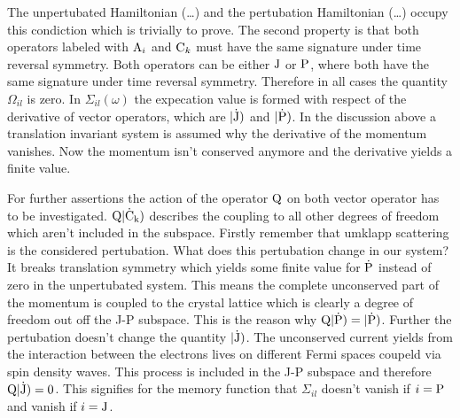 The unpertubated Hamiltonian (\dots{}) and the pertubation Hamiltonian (\dots{}) occupy this condiction which is trivially to prove.
The second property is that both operators labeled with $\mathrm{A}_{i}$ and $\mathrm{C}_{k}$ must have the same signature under time reversal symmetry.
Both operators can be either $\mathrm{J}$ or $\mathrm{P}$, where both have the same signature under time reversal symmetry.
Therefore in all cases the quantity $\Omega_{il}$ is zero.
In $\Sigma_{il}(\omega)$ the expecation value is formed with respect of the derivative of vector operators, which are $|\mathrm{\dot{\mathrm{J}}})$ and $|\mathrm{\dot{\mathrm{P}}})$.
In the discussion above a translation invariant system is assumed why the derivative of the momentum vanishes.
Now the momentum isn't conserved anymore and the derivative yields a finite value.

For further assertions the action of the operator $\mathrm{Q}$ on both vector operator has to be investigated.
$\mathrm{Q} |\mathrm{\dot{\mathrm{C}}_{k}})$ describes the coupling to all other degrees of freedom which aren't included in the subspace.
Firstly remember that umklapp scattering is the considered pertubation.
What does this pertubation change in our system?
It breaks translation symmetry which yields some finite value for $\dot{\mathrm{P}}$ instead of zero in the unpertubated system.
This means the complete unconserved part of the momentum is coupled to the crystal lattice which is clearly a degree of freedom out off the J-P subspace.
This is the reason why $\mathrm{Q} |\mathrm{\dot{\mathrm{P}}}) = |\mathrm{\dot{\mathrm{P}}})$.
Further the pertubation doesn't change the quantity $|\mathrm{\dot{\mathrm{J}}})$.
The unconserved current yields from the interaction between the electrons lives on different Fermi spaces coupeld via spin density waves.
This process is included in the J-P subspace and therefore $\mathrm{Q} |\mathrm{\dot{\mathrm{J}}}) = 0$.
This signifies for the memory function that $\Sigma_{il}$ doesn't vanish if $i=\mathrm{P}$ and vanish if $i=\mathrm{J}$.

